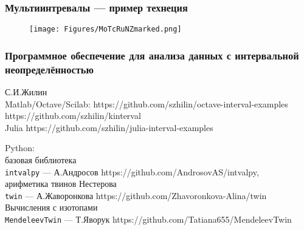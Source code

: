 \begin{frame}
\frametitle{Мультиинтревалы --- пример технеция }
\begin{figure}[ht] 
	\begin{center}
		\unitlength=1mm
		{\texttt{[image: Figures/MoTcRuNZmarked.png]}}
	\end{center}	
\end{figure}	

\end{frame}


\begin{frame}
\frametitle{Программное обеспечение для анализа данных с интервальной неопределённостью}

С.И.Жилин \\
Matlab/Octave/Scilab:
https://github.com/szhilin/octave-interval-examples\\
https://github.com/szhilin/kinterval \\
Julia
https://github.com/szhilin/julia-interval-examples



\medskip
Python: \\
базовая библиотека\\
{\tt intvalpy} --- А.Андросов https://github.com/AndrosovAS/intvalpy, \\
арифметика твинов Нестерова\\
{\tt twin} --- А.Жаворонкова https://github.com/Zhavoronkova-Alina/twin\\ 
Вычисления с изотопами\\
{\tt MendeleevTwin} --- Т.Яворук https://github.com/Tatiana655/MendeleevTwin



\end{frame}

